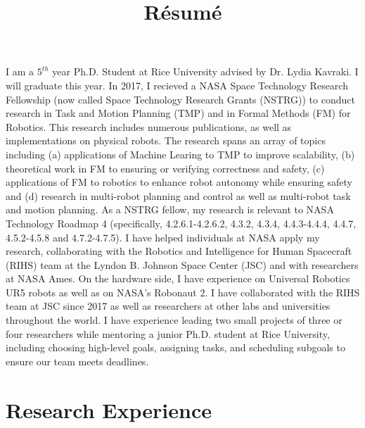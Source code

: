 \documentclass[11pt,a4paper,sans]{moderncv}        %
\title{R\'{e}sum\'{e}}                               %
\begin{document}
\makecvtitle

\small{I am a $5^{th}$ year Ph.D. Student at Rice University advised by Dr. Lydia Kavraki. I will graduate this year. In 2017, I recieved a NASA Space Technology Research Fellowship (now called Space Technology Research Grants (NSTRG)) to conduct research in Task and Motion Planning (TMP) and in Formal Methods (FM) for Robotics. This research includes numerous publications, as well as implementations on physical robots. The research spans an array of topics including (a) applications of Machine Learing to TMP to improve scalability, (b) theoretical work in FM to ensuring or verifying correctness and safety, (c) applications of FM to robotics to enhance robot autonomy while ensuring safety and (d) research in multi-robot planning and control as well as multi-robot task and motion planning. As a NSTRG fellow, my research is relevant to NASA Technology Roadmap 4 (specifically, 4.2.6.1-4.2.6.2, 4.3.2, 4.3.4, 4.4.3-4.4.4, 4.4.7, 4.5.2-4.5.8 and 4.7.2-4.7.5). I have helped individuals at NASA apply my research, collaborating with the Robotics and Intelligence for Human Spacecraft (RIHS) team at the Lyndon B. Johnson Space Center (JSC) and with researchers at NASA Ames. On the hardware side, I have experience on Universal Robotics UR5 robots as well as on NASA's Robonaut 2. I have collaborated with the RIHS team at JSC since 2017 as well as researchers at other labs and universities throughout the world. I have experience leading two small projects of three or four researchers while mentoring a junior Ph.D. student at Rice University, including choosing high-level goals, assigning tasks, and scheduling subgoals to ensure our team meets deadlines.}

\section{Research Experience}

\vspace{6pt}
\end{document}
